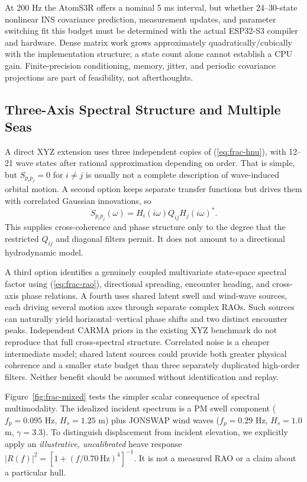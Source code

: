 At 200 Hz the AtomS3R offers a nominal 5 ms interval, but whether
24--30-state nonlinear INS covariance prediction, measurement
updates, and parameter switching fit this budget must be determined
with the actual ESP32-S3 compiler and hardware. Dense matrix work
grows approximately quadratically/cubically with the implementation
structure; a state count alone cannot establish a CPU gain.
Finite-precision conditioning, memory, jitter, and periodic
covariance projections are part of feasibility, not afterthoughts.

\subsection{Three-Axis Spectral Structure and Multiple Seas}
\label{sec:frac-three-axis}
A direct XYZ extension uses three independent copies of
(\ref{eq:frac-hnu}), with 12--21 wave states after rational
approximation depending on order. That is simple, but
\(S_{p_i p_j}=0\) for \(i\ne j\) is usually not a
complete description of wave-induced orbital motion. A second
option keeps separate transfer functions but drives them with
correlated Gaussian innovations, so
\begin{equation}
S_{p_i p_j}(\omega)=
H_i(i\omega)Q_{ij}H_j(i\omega)^*.
\label{eq:frac-correlated}
\end{equation}
This supplies cross-coherence and phase structure only to the degree
that the restricted \(Q_{ij}\) and diagonal filters permit.
It does not amount to a directional hydrodynamic model.

A third option identifies a genuinely coupled multivariate state-space
spectral factor using (\ref{eq:frac-rao}), directional spreading,
encounter heading, and cross-axis phase relations. A fourth uses
shared latent swell and wind-wave sources, each driving several
motion axes through separate complex RAOs. Such sources can naturally
yield horizontal--vertical phase shifts and two distinct encounter
peaks. Independent CARMA priors in the existing XYZ benchmark do
not reproduce that full cross-spectral structure. Correlated
noise is a cheaper intermediate model; shared latent sources could
provide both greater physical coherence and a smaller state budget
than three separately duplicated high-order filters. Neither benefit
should be assumed without identification and replay.

Figure~\ref{fig:frac-mixed} tests the simpler scalar consequence
of spectral multimodality. The idealized incident spectrum is
a PM swell component (\(f_p=0.095\) Hz, \(H_s=1.25\) m)
plus JONSWAP wind waves (\(f_p=0.29\) Hz,
\(H_s=1.0\) m, \(\gamma=3.3\)).
To distinguish displacement from incident elevation, we explicitly
apply an \emph{illustrative, uncalibrated} heave response
\(|R(f)|^2=[1+(f/0.70\,\mathrm{Hz})^4]^{-1}\).
It is not a measured RAO or a claim about a particular hull.

